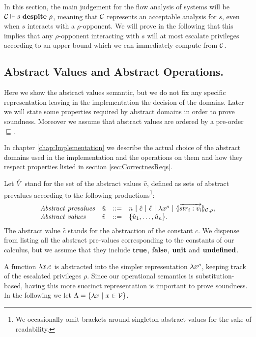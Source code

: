 In this section, the main judgement for the flow analysis of systems
will be ${\cal C}\Vdash s \ \mathbf{despite}\ \rho$, meaning that ${\cal C}$ represents
an acceptable analysis for $s$, even when $s$ interacts with a $\rho$-opponent.
We will prove in the following that this implies that any $\rho$-opponent
interacting with $s$ will at most escalate privileges according to an
upper bound which we can immediately compute from ${\cal C}$.

\subsection{Abstract Values and Abstract Operations.} 
Here we show the abstract values semantic, but we do not fix any specific representation leaving in the implementation the decision of the domains. Later we will state some properties required by abstract domains in order to prove soundness. Moreover we assume that abstract values are ordered by a pre-order $\sqsubseteq$.

In chapter \ref{chap:Implementation} we describe the actual choice of the abstract domains used in the implementation and the operations on them and how they respect properties listed in section \ref{sec:CorrectnesReqs}.


Let $\hat{V}$ stand for the set of the abstract values $\hat{v}$,
defined as sets of abstract prevalues according to the following 
productions\footnote{We occasionally omit brackets around singleton 
abstract values for the sake of readability.}:
\[
\begin{array}{llcl}
\mathit{Abstract\ prevalues} & \hat{u} & ::= & n ~|~ \hat{c} ~|~ \ell ~|~ \lambda x^{\rho} ~|~ \langle\!| \overrightarrow{str_i: v_i} |\!\rangle_{{\cal C},\rho}, \\
\mathit{Abstract\ values} & \hat{v} & ::= & \{\hat{u}_1,\ldots,\hat{u}_n\}.
\end{array}
\]
The abstract value $\hat{c}$ stands for the abstraction of the constant $c$.
We dispense from listing all the abstract pre-values corresponding to 
the constants of our calculus, but we assume that they include $\mathbf{true}$, 
$\mathbf{false}$, $\mathbf{unit}$ and $\mathbf{undefined}$.

A function $\lambda x.e$ is abstracted into the simpler representation
$\lambda x^{\rho}$, keeping track of the escalated privileges $\rho$. Since 
our operational semantics is substitution-based, having this more succinct
representation is important to prove soundness. In the following we let 
$\Lambda = \{\lambda x ~|~ x \in \mathcal{V}\}$.

